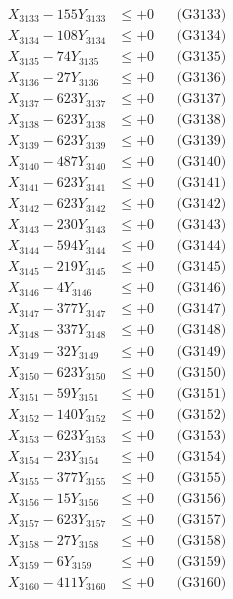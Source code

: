 \documentclass[a4paper,10pt]{article}
\begin{document}
{\begin{align}
X_{3133} - 155Y_{3133} &\leq +0 && \text{(G3133)} \\
X_{3134} - 108Y_{3134} &\leq +0 && \text{(G3134)} \\
X_{3135} - 74Y_{3135} &\leq +0 && \text{(G3135)} \\
X_{3136} - 27Y_{3136} &\leq +0 && \text{(G3136)} \\
X_{3137} - 623Y_{3137} &\leq +0 && \text{(G3137)} \\
X_{3138} - 623Y_{3138} &\leq +0 && \text{(G3138)} \\
X_{3139} - 623Y_{3139} &\leq +0 && \text{(G3139)} \\
X_{3140} - 487Y_{3140} &\leq +0 && \text{(G3140)} \\
\allowbreak
X_{3141} - 623Y_{3141} &\leq +0 && \text{(G3141)} \\
X_{3142} - 623Y_{3142} &\leq +0 && \text{(G3142)} \\
X_{3143} - 230Y_{3143} &\leq +0 && \text{(G3143)} \\
X_{3144} - 594Y_{3144} &\leq +0 && \text{(G3144)} \\
X_{3145} - 219Y_{3145} &\leq +0 && \text{(G3145)} \\
X_{3146} - 4Y_{3146} &\leq +0 && \text{(G3146)} \\
X_{3147} - 377Y_{3147} &\leq +0 && \text{(G3147)} \\
X_{3148} - 337Y_{3148} &\leq +0 && \text{(G3148)} \\
X_{3149} - 32Y_{3149} &\leq +0 && \text{(G3149)} \\
X_{3150} - 623Y_{3150} &\leq +0 && \text{(G3150)} \\
\allowbreak
X_{3151} - 59Y_{3151} &\leq +0 && \text{(G3151)} \\
X_{3152} - 140Y_{3152} &\leq +0 && \text{(G3152)} \\
X_{3153} - 623Y_{3153} &\leq +0 && \text{(G3153)} \\
X_{3154} - 23Y_{3154} &\leq +0 && \text{(G3154)} \\
X_{3155} - 377Y_{3155} &\leq +0 && \text{(G3155)} \\
X_{3156} - 15Y_{3156} &\leq +0 && \text{(G3156)} \\
X_{3157} - 623Y_{3157} &\leq +0 && \text{(G3157)} \\
X_{3158} - 27Y_{3158} &\leq +0 && \text{(G3158)} \\
X_{3159} - 6Y_{3159} &\leq +0 && \text{(G3159)} \\
X_{3160} - 411Y_{3160} &\leq +0 && \text{(G3160)} \\

\end{align}}
\end{document}
